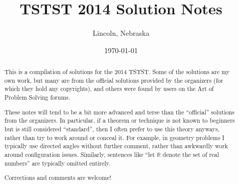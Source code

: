 \documentclass[11pt]{scrartcl}
\begin{document}
\title{TSTST 2014 Solution Notes}
\subtitle{Lincoln, Nebraska}
\date{\today}

\maketitle
\begin{abstract}
This is a compilation of solutions
for the 2014 TSTST.
Some of the solutions are my own work,
but many are from the official solutions provided by the organizers
(for which they hold any copyrights),
and others were found by users on the Art of Problem Solving forums.

These notes will tend to be a bit more advanced and terse than the ``official''
solutions from the organizers.
In particular, if a theorem or technique is not known to beginners
but is still considered ``standard'', then I often prefer to
use this theory anyways, rather than try to work around or conceal it.
For example, in geometry problems I typically use directed angles
without further comment, rather than awkwardly work around configuration issues.
Similarly, sentences like ``let $\mathbb{R}$ denote the set of real numbers''
are typically omitted entirely.

Corrections and comments are welcome!
\end{abstract}
\tableofcontents
\newpage

\addtocounter{section}{-1}
\end{document}
